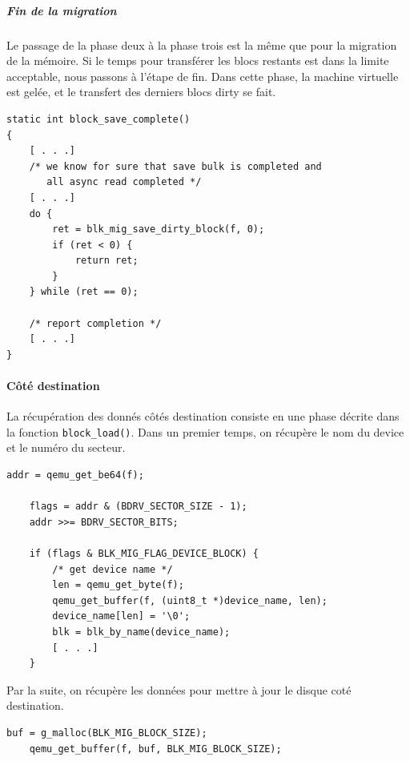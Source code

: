 \subparagraph*{Fin de la migration}
Le passage de la phase deux à la phase trois est la même que pour la migration de la mémoire.
Si le temps pour transférer les blocs restants est dans la limite acceptable, nous passons à l'étape de fin.
Dans cette phase, la machine virtuelle est gelée, et le transfert des derniers blocs dirty se fait.

\begin{lstlisting}[caption={Code responsable de la phase de fin},captionpos=b]
static int block_save_complete()
{
    [ . . .]
    /* we know for sure that save bulk is completed and
       all async read completed */
    [ . . .]
    do {
        ret = blk_mig_save_dirty_block(f, 0);
        if (ret < 0) {
            return ret;
        }
    } while (ret == 0);

    /* report completion */
    [ . . .]
}
\end{lstlisting}



\paragraph*{Côté destination}
La récupération des donnés côtés destination consiste en une phase décrite dans la fonction \texttt{block\_load()}.
Dans un premier temps, on récupère le nom du device et le numéro du secteur.
\begin{lstlisting}[caption={Code responsable de la récupération du nom du device et du numéro de secteur},captionpos=b]
    addr = qemu_get_be64(f);
       
    flags = addr & (BDRV_SECTOR_SIZE - 1);
    addr >>= BDRV_SECTOR_BITS;

    if (flags & BLK_MIG_FLAG_DEVICE_BLOCK) {
        /* get device name */
        len = qemu_get_byte(f);
        qemu_get_buffer(f, (uint8_t *)device_name, len);
        device_name[len] = '\0';
        blk = blk_by_name(device_name);
        [ . . .]
    }
\end{lstlisting}

Par la suite, on récupère les données pour mettre à jour le disque coté destination.
\begin{lstlisting}[caption={Code responsable de la récupération des données},captionpos=b]
    buf = g_malloc(BLK_MIG_BLOCK_SIZE);
    qemu_get_buffer(f, buf, BLK_MIG_BLOCK_SIZE);
\end{lstlisting}
